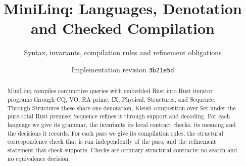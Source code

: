 
\title{MiniLinq: Languages, Denotation and Checked Compilation}
\author{Syntax, invariants, compilation rules and refinement obligations}
\date{Implementation revision \texttt{3b21e5d}}

\maketitle
\begin{abstract}
MiniLinq compiles conjunctive queries with embedded Rust into Rust iterator
programs through CQ, VO, RA prime, IX, Physical, Structures, and Sequence.
Through Structures these share one denotation, Kleisli composition over
$\mathrm{Set}$ under the pure-total Rust premise; Sequence refines it through
support and decoding. For each language we give its
grammar, the invariants its local contract checks, its meaning and the
decisions it records. For each pass we give its compilation rules, the
structural correspondence check that is run independently of the pass, and
the refinement statement that check supports. Checks are ordinary structural
contracts: no search and no equivalence decision.
\end{abstract}




















